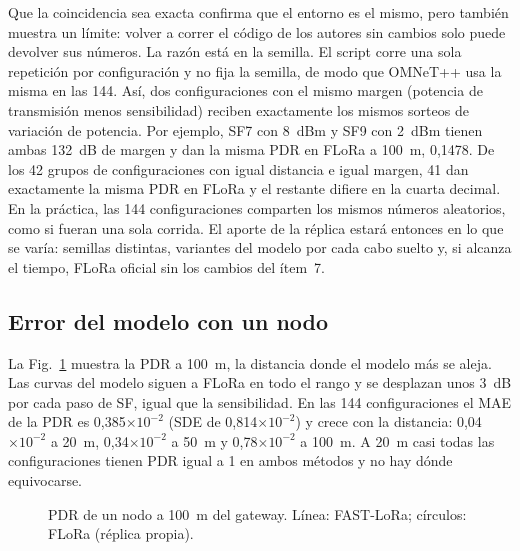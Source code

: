 \documentclass[conference,a4paper]{IEEEtran}
\begin{document}
Que la coincidencia sea exacta confirma que el entorno es el mismo, pero también muestra un límite: volver a correr el código de los autores sin cambios solo puede devolver sus números. La razón está en la semilla. El script corre una sola repetición por configuración y no fija la semilla, de modo que OMNeT++ usa la misma en las 144. Así, dos configuraciones con el mismo margen (potencia de transmisión menos sensibilidad) reciben exactamente los mismos sorteos de variación de potencia. Por ejemplo, SF7 con 8~dBm y SF9 con 2~dBm tienen ambas 132~dB de margen y dan la misma PDR en FLoRa a 100~m, 0,1478. De los 42 grupos de configuraciones con igual distancia e igual margen, 41 dan exactamente la misma PDR en FLoRa y el restante difiere en la cuarta decimal. En la práctica, las 144 configuraciones comparten los mismos números aleatorios, como si fueran una sola corrida.
El aporte de la réplica estará entonces en lo que se varía: semillas distintas, variantes del modelo por cada cabo suelto y, si alcanza el tiempo, FLoRa oficial sin los cambios del ítem~7.

\subsection{Error del modelo con un nodo}

La Fig.~\ref{fig:pdr} muestra la PDR a 100~m, la distancia donde el modelo más se aleja. Las curvas del modelo siguen a FLoRa en todo el rango y se desplazan unos 3~dB por cada paso de SF, igual que la sensibilidad. En las 144 configuraciones el MAE de la PDR es 0,385$\times10^{-2}$ (SDE de 0,814$\times10^{-2}$)
y crece con la distancia: 0,04$\times10^{-2}$ a 20~m, 0,34$\times10^{-2}$ a 50~m y 0,78$\times10^{-2}$ a 100~m. A 20~m casi todas las configuraciones tienen PDR igual a 1 en ambos métodos y no hay dónde equivocarse.

\begin{figure}[t]
\centering
{}
\caption{PDR de un nodo a 100~m del gateway. Línea: FAST-LoRa; círculos: FLoRa (réplica propia).}
\label{fig:pdr}
\end{figure}
\end{document}
